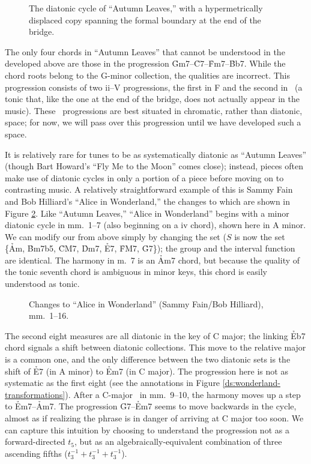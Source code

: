 \begin{figure}[htbp]
  \caption{The diatonic cycle of “Autumn Leaves,” with a hypermetrically
    displaced copy spanning the formal boundary at the end of the bridge.}
  \label{ds:displaced-cycle}
\end{figure}

The only four chords in “Autumn Leaves” that cannot be understood in the
\gis{} developed above are those in the progression
\h{Gm7}--\h{C7}--\h{Fm7}--\h{Bb7}. While the chord roots belong to the G-minor
collection, the qualities are incorrect. This progression consists of two
\mbox{ii--V} progressions, the first in F and the second in
\Eflat\ (a tonic that, like the one at the end of the bridge, does not
actually appear in the music). These \tf\ progressions are best situated in
chromatic, rather than diatonic, space; for now, we will pass over this
progression until we have developed such a space.

It is relatively rare for tunes to be as systematically diatonic as “Autumn
Leaves” (though Bart Howard’s “Fly Me to the Moon” comes close); instead,
pieces often make use of diatonic cycles in only a portion of a piece before
moving on to contrasting music. A relatively straightforward example of this
is Sammy Fain and Bob Hilliard’s “Alice in Wonderland,” the changes to which
are shown in Figure \ref{ds:wonderland-changes}. Like “Autumn
Leaves,” “Alice in Wonderland” begins with a minor diatonic cycle in mm.~1--7
(also beginning on a iv chord), shown here in A minor. We can modify our \gis{}
from above simply by changing the set ($S$ is now the set \{\h{Am}, \h{Bm7b5},
\h{CM7}, \h{Dm7}, \h{E7}, \h{FM7}, \h{G7}\}); the group \ivls{} and the
interval function are identical. The harmony in m.~7 is an \h{Am7} chord,
but because the quality of the tonic seventh chord is ambiguous in minor
keys, this chord is easily understood as tonic.

\begin{figure}[htbp]
  \caption{Changes to “Alice in Wonderland” (Sammy Fain/Bob Hilliard), mm.\
  1--16.}
  \label{ds:wonderland-changes}
\end{figure}

The second eight measures are all diatonic in the key of C major; the linking
\h{Eb7} chord signals a shift between diatonic collections.\fn{ds-14} This
move to the relative major is a common one, and the only difference between
the two diatonic sets is the shift of \h{E7} (in A minor) to \h{Em7} (in C
major). The progression here is not as systematic as the first eight (see the
annotations in Figure \ref{ds:wonderland-transformations}). After a C-major
\tf\ in mm.~9--10, the harmony moves up a step to \h{Em7}--\h{Am7}.
The progression \h{G7}--\h{Em7} seems to move backwards in the cycle, almost
as if realizing the phrase is in danger of arriving at C major too soon. We
can capture this intuition by choosing to understand the progression not as a
forward-directed $t_5$, but as an algebraically-equivalent combination of
three ascending fifths ($t_3^{-1} + t_3^{-1} + t_3^{-1}$).

